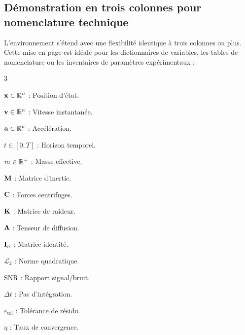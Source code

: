 \setlength{\columnseprule}{0pt} %

\subsection{Démonstration en trois colonnes pour nomenclature technique}

L'environnement  s'étend avec une flexibilité identique à trois colonnes ou plus.
Cette mise en page est idéale pour les dictionnaires de variables,
les tables de nomenclature ou les inventaires de paramètres expérimentaux :

\begin{multicols}{3}
\raggedcolumns
\raggedright
\small

\noindent{\bfseries\sffamily\textcolor{ThesisPrimary}{Paramètres d'état :}}\par\vspace{2pt}
$\boldsymbol{\mathbf{x}} \in \mathbb{R}^n$ : Position d'état.\par
$\boldsymbol{\mathbf{v}} \in \mathbb{R}^n$ : Vitesse instantanée.\par
$\boldsymbol{\mathbf{a}} \in \mathbb{R}^n$ : Accélération.\par
$t \in [0, T]$ : Horizon temporel.\par
$m \in \mathbb{R}^+$ : Masse effective.

\columnbreak

\noindent{\bfseries\sffamily\textcolor{ThesisPrimary}{Opérateurs tensoriels :}}\par\vspace{2pt}
$\boldsymbol{\mathbf{M}}$ : Matrice d'inertie.\par
$\boldsymbol{\mathbf{C}}$ : Forces centrifuges.\par
$\boldsymbol{\mathbf{K}}$ : Matrice de raideur.\par
$\boldsymbol{\mathbf{\Lambda}}$ : Tenseur de diffusion.\par
$\boldsymbol{\mathbf{I}}_n$ : Matrice identité.

\columnbreak

\noindent{\bfseries\sffamily\textcolor{ThesisPrimary}{Critères et Métriques :}}\par\vspace{2pt}
$\mathcal{L}_2$ : Norme quadratique.\par
$\mathrm{SNR}$ : Rapport signal/bruit.\par
$\Delta t$ : Pas d'intégration.\par
$\varepsilon_{\mathrm{tol}}$ : Tolérance de résidu.\par
$\eta$ : Taux de convergence.

\end{multicols}

